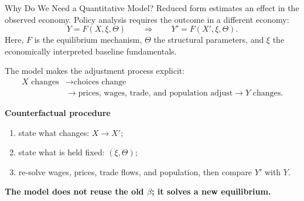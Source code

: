 \documentclass[aspectratio=169,11pt]{beamer}
\newcommand{\B}[1]{\textcolor{blue1}{\textbf{#1}}}
\newcommand{\hi}[1]{\textcolor{deepred}{\textbf{#1}}}
\begin{document}
\begin{frame}{Why Do We Need a Quantitative Model?}
  Reduced form estimates an effect in the observed economy. Policy analysis
  requires the outcome in a different economy:
  \[
    Y=F(X,\xi,\Theta)
    \qquad\Longrightarrow\qquad
    Y'=F(X',\xi,\Theta).
  \]
  Here, \(F\) is the equilibrium mechanism, \(\Theta\) the structural parameters,
  and \(\xi\) the economically interpreted baseline fundamentals.

  The model makes the adjustment process explicit:
  \[
    \begin{aligned}
      X\text{ changes}
      &\longrightarrow \text{choices change}\\[-1pt]
      &\longrightarrow
      \text{prices, wages, trade, and population adjust}
      \longrightarrow Y\text{ changes}.
    \end{aligned}
  \]

  \B{Counterfactual procedure}
  \begin{enumerate}\setlength{\itemsep}{2pt}
    \item state what changes: \(X\rightarrow X'\);
    \item state what is held fixed: \((\xi,\Theta)\);
    \item re-solve wages, prices, trade flows, and population, then compare
      \(Y'\) with \(Y\).
  \end{enumerate}

  \vfill
  \centering
  \hi{The model does not reuse the old \(\beta\); it solves a new equilibrium.}
\end{frame}
\end{document}

